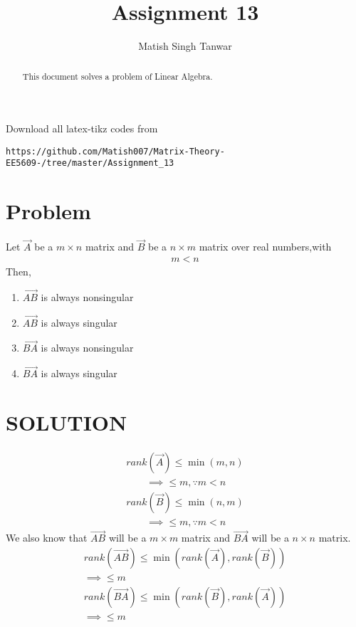 \documentclass[journal,12pt,twocolumn]{IEEEtran}
\begin{document}
 \vspace{3cm}
 \title{Assignment 13}
 \author{Matish Singh Tanwar}
 \maketitle
 \newpage
 \bigskip
 \renewcommand{\thetable}{\theenumi}
\vspace{1.0cm}
\begin{abstract}
This document solves a problem of Linear Algebra.
\end{abstract}
\vspace{0.5cm}
%
Download all latex-tikz codes from 
\begin{lstlisting}
https://github.com/Matish007/Matrix-Theory-EE5609-/tree/master/Assignment_13
\end{lstlisting}
%
%
\vspace{0.5mm}
\section{Problem}
Let $\vec{A}$ be a $m \times n$ matrix and $\vec{B}$ be a $n \times m$ matrix over real numbers,with
\begin{align}
m<n
\end{align}
Then,
\begin{enumerate}
\item{$\vec{AB}$ is always nonsingular}
\item{$\vec{AB}$ is always singular}
\item{$\vec{BA}$ is always nonsingular}
\item{$\vec{BA}$ is always singular}
\end{enumerate}
\section{SOLUTION}
\begin{align}
    rank(\vec{A})\leq \min{(m,n)}\\
    \qquad \implies \leq m, \because m<n\\
    rank(\vec{B})\leq \min{(n,m)}\\
    \qquad \implies \leq m, \because m<n
\end{align}
We also know that $\vec{AB}$ will be a $m \times m$ matrix and $\vec{BA}$ will be a $n \times n$ matrix.
\begin{align}
    rank(\vec{AB})\leq \min{(rank(\vec{A}),rank(\vec{B}))}\\
     \implies \leq m\\
     rank(\vec{BA})\leq \min{(rank(\vec{B}),rank(\vec{A}))}\\
      \implies \leq m
\end{align}
\end{document}
